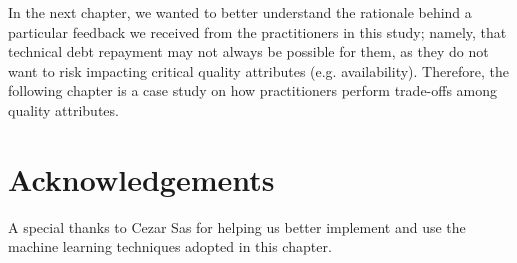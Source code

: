 In the next chapter, we wanted to better understand the rationale behind a particular feedback we received from the practitioners in this study; namely, that technical debt repayment may not always be possible for them, as they do not want to risk impacting critical quality attributes (e.g. availability).
Therefore, the following chapter is a case study on how practitioners perform trade-offs among quality attributes. 

\section*{Acknowledgements}
A special thanks to Cezar Sas for helping us better implement and use the machine learning techniques adopted in this chapter.
